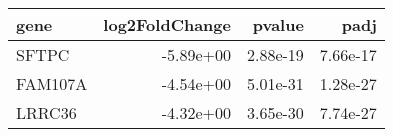 \begin{tabular}{lrrr}
\toprule
   gene &  log2FoldChange &   pvalue &     padj \\
\midrule
  SFTPC &       -5.89e+00 & 2.88e-19 & 7.66e-17 \\
FAM107A &       -4.54e+00 & 5.01e-31 & 1.28e-27 \\
 LRRC36 &       -4.32e+00 & 3.65e-30 & 7.74e-27 \\
\bottomrule
\end{tabular}
